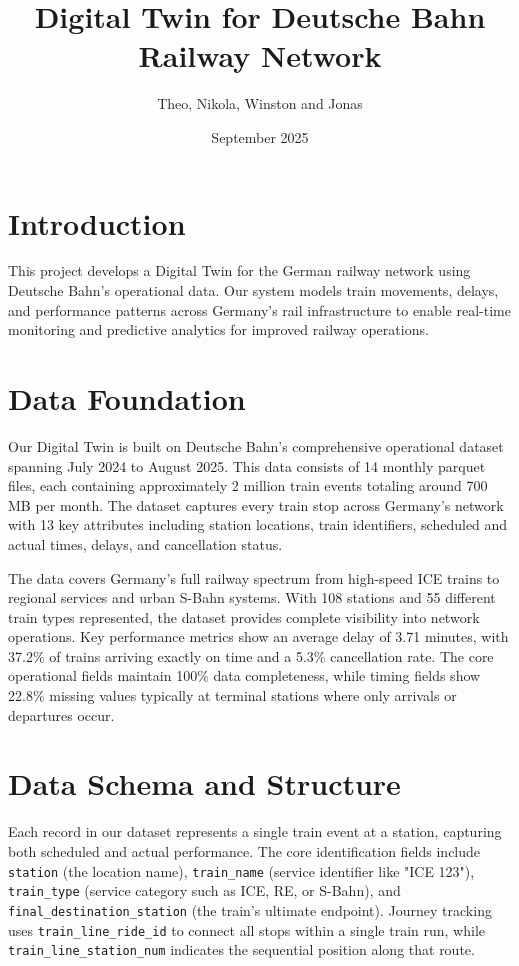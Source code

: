 \documentclass{article}
\title{Digital Twin for Deutsche Bahn Railway Network}
\author{Theo, Nikola, Winston and Jonas}
\date{September 2025}
\begin{document}
\maketitle

\section{Introduction}

This project develops a Digital Twin for the German railway network using Deutsche Bahn's operational data. Our system models train movements, delays, and performance patterns across Germany's rail infrastructure to enable real-time monitoring and predictive analytics for improved railway operations.

\section{Data Foundation}

Our Digital Twin is built on Deutsche Bahn's comprehensive operational dataset spanning July 2024 to August 2025. This data consists of 14 monthly parquet files, each containing approximately 2 million train events totaling around 700 MB per month. The dataset captures every train stop across Germany's network with 13 key attributes including station locations, train identifiers, scheduled and actual times, delays, and cancellation status.

The data covers Germany's full railway spectrum from high-speed ICE trains to regional services and urban S-Bahn systems. With 108 stations and 55 different train types represented, the dataset provides complete visibility into network operations. Key performance metrics show an average delay of 3.71 minutes, with 37.2\% of trains arriving exactly on time and a 5.3\% cancellation rate. The core operational fields maintain 100\% data completeness, while timing fields show 22.8\% missing values typically at terminal stations where only arrivals or departures occur.

\section{Data Schema and Structure}

Each record in our dataset represents a single train event at a station, capturing both scheduled and actual performance. The core identification fields include \texttt{station} (the location name), \texttt{train\_name} (service identifier like "ICE 123"), \texttt{train\_type} (service category such as ICE, RE, or S-Bahn), and \texttt{final\_destination\_station} (the train's ultimate endpoint). Journey tracking uses \texttt{train\_line\_ride\_id} to connect all stops within a single train run, while \texttt{train\_line\_station\_num} indicates the sequential position along that route.
\end{document}
